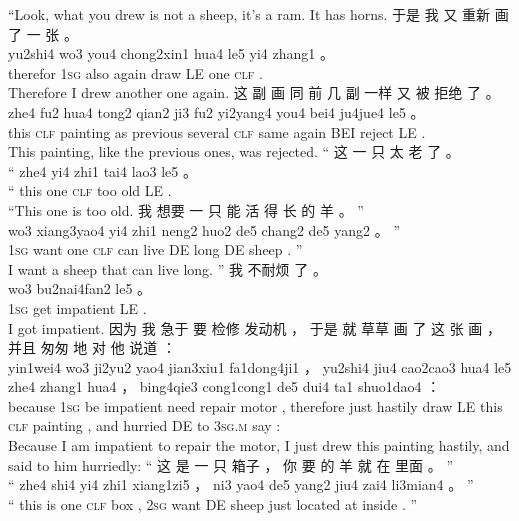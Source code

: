 \documentclass[UTF8]{ctexart}
\begin{document}
\begin{exe}
\trans ``Look, what you drew is not a sheep, it's a ram. It has horns.
\ex
\glll
于是 我 又 重新 画 了 一 张 。
\\
yu2shi4 wo3 you4 chong2xin1 hua4 le5 yi4 zhang1 。
\\
therefor \textsc{1sg} also again draw LE one \textsc{clf} .
\\
\trans Therefore I drew another one again.
\ex
\glll
这 副 画 同 前 几 副 一样 又 被 拒绝 了 。
\\
zhe4 fu2 hua4 tong2 qian2 ji3 fu2 yi2yang4 you4 bei4 ju4jue4 le5 。
\\
this \textsc{clf} painting as previous several \textsc{clf} same again BEI reject LE .
\\
\trans This painting, like the previous ones, was rejected. 
\ex
\glll
“ 这 一 只 太 老 了 。
\\
“ zhe4 yi4 zhi1 tai4 lao3 le5 。
\\
`` this one \textsc{clf} too old LE .
\\
\trans ``This one is too old.
\ex
\glll
我 想要 一 只 能 活 得 长 的 羊 。 ”
\\
wo3 xiang3yao4 yi4 zhi1 neng2 huo2 de5 chang2 de5 yang2 。 ”
\\
\textsc{1sg} want one \textsc{clf} can live DE long DE sheep . ''
\\
\trans I want a sheep that can live long. ''
\ex
\glll
我 不耐烦 了 。
\\
wo3 bu2nai4fan2 le5 。
\\
\textsc{1sg} {get impatient} LE .
\\
\trans I got impatient. 
\ex
\glll
因为 我 急于 要 检修 发动机 ， 于是 就 草草 画 了 这 张 画 ， 并且 匆匆 地 对 他 说道 ：
\\
yin1wei4 wo3 ji2yu2 yao4 jian3xiu1 fa1dong4ji1 ， yu2shi4 jiu4 cao2cao3 hua4 le5 zhe4 zhang1 hua4 ， bing4qie3 cong1cong1 de5 dui4 ta1 shuo1dao4 ：
\\
because \textsc{1sg} {be impatient} need repair motor , therefore just hastily draw LE this \textsc{clf} painting , and hurried DE to \textsc{3sg.m} say :
\\
\trans Because I am impatient to repair the motor, I just drew this painting hastily, and said to him hurriedly:
\ex
\glll
“ 这 是 一 只 箱子 ， 你 要 的 羊 就 在 里面 。 ”
\\
“ zhe4 shi4 yi4 zhi1 xiang1zi5 ， ni3 yao4 de5 yang2 jiu4 zai4 li3mian4 。 ”
\\
`` this is one \textsc{clf} box , \textsc{2sg} want DE sheep just {located at} inside . ''
\\

\end{exe}
\end{document}
